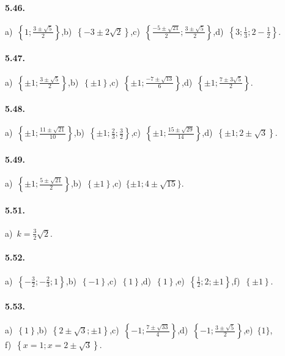 \paragraph{5.46.} a)~$\left\{1;\frac{3\pm \sqrt 5} 2\right\}$,\quad b)~$\left\{-3\pm 2\sqrt 2\right\}$,\quad c)~$\left\{\frac{-5\pm \sqrt{21}} 2;\frac{3\pm \sqrt 5} 2\right\}$,\quad d)~$\left\{3;\frac 1 3;2-\frac 1 2\right\}$.

\paragraph{5.47.} a)~$\left\{\pm 1;\frac{3\pm \sqrt 5} 2\right\}$,\quad b)~$\left\{\pm 1\right\}$,\quad c)~$\left\{\pm 1;\frac{-7\pm \sqrt{13}} 6\right\}$,\quad d)~$\left\{\pm 1;\frac{7\pm 3\sqrt 5} 2\right\}$.

\paragraph{5.48.} a)~$\left\{\pm 1;\frac{11\pm \sqrt{21}}{10}\right\}$,\quad b)~$\left\{\pm 1;\frac 2 3;\frac 3 2\right\}$,\quad c)~$\left\{\pm 1;\frac{15\pm \sqrt{29}}{14}\right\}$,\quad d)~$\left\{\pm 1;2\pm \sqrt 3\right\}$.

\paragraph{5.49.} a)~$\left\{\pm 1;\frac{5\pm \sqrt{21}} 2\right\}$,\quad b)~$\left\{\pm 1\right\}$,\quad c)~$\{\pm 1;4\pm \sqrt{15}\}$.

\paragraph{5.51.} a)~$k=\frac 3 2\sqrt 2$.

\paragraph{5.52.} a)~$\left\{-\frac 3 2;-\frac 2 3;1\right\}$,\quad b)~$\left\{-1\right\}$,\quad c)~$\left\{1\right\}$,\quad d)~$\left\{1\right\}$,\quad e)~$\left\{\frac 1 2;2;\pm 1\right\}$,\quad f)~$\left\{\pm 1\right\}$.

\paragraph{5.53.} a)~$\left\{1\right\}$,\quad b)~$\left\{2\pm \sqrt 3;\pm 1\right\}$,\quad c)~$\left\{-1;\frac{7\pm\sqrt{33}} 4\right\}$,\quad d)~$\left\{-1;\frac{3\pm\sqrt 5} 2 \right\}$,\quad e)~$\{1\}$,\protect\\ \quad f)~$\left\{x=1;x=2\pm\sqrt 3\right\}$.

